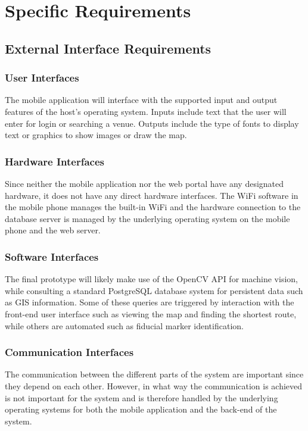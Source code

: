 \documentclass{article}
\begin{document}
\newpage
\section{Specific Requirements}

	\subsection{External Interface Requirements}
		\subsubsection{User Interfaces}
		        The mobile application will interface with the supported input and output features of the host's operating system. Inputs include text that the user will enter for login or searching a venue. Outputs include the type of fonts to display text or graphics to show images or draw the map.

		\subsubsection{Hardware Interfaces}
			Since neither the mobile application nor the web portal have any designated hardware, it does not have any direct hardware interfaces. The WiFi software in the mobile phone manages the built-in WiFi and the hardware connection to the database server is managed by the underlying operating system on the mobile phone and the web server.

		\subsubsection{Software Interfaces}
		The final prototype will likely make use of the OpenCV API for machine vision, while consulting a standard PostgreSQL database system for persistent data such as GIS information. Some of these queries are triggered by interaction with the front-end user interface such as viewing the map and finding the shortest route, while others are automated such as fiducial marker identification.

		\subsubsection{Communication Interfaces}
			The communication between the different parts of the system are important since they depend on each other. However, in what way the communication is achieved is not important for the system and is therefore handled by the underlying operating systems for both the mobile application and the back-end of the system.
	
\end{document}
